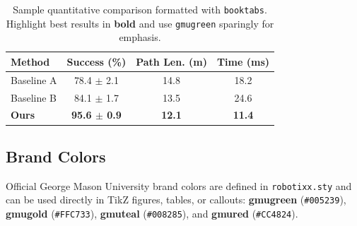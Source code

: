 \begin{table}[t]
    \centering
    \caption{Sample quantitative comparison formatted with \texttt{booktabs}. Highlight best results in \textbf{bold} and use \texttt{gmugreen} sparingly for emphasis.}
    \label{tab:example}
    \small
    \begin{tabular}{lccc}
        \toprule
        \textbf{Method} & \textbf{Success (\%)} & \textbf{Path Len. (m)} & \textbf{Time (ms)} \\
        \midrule
        Baseline A      & 78.4 $\pm$ 2.1        & 14.8                   & 18.2 \\
        Baseline B      & 84.1 $\pm$ 1.7        & 13.5                   & 24.6 \\
        \textbf{Ours}   & \textbf{95.6 $\pm$ 0.9} & \textbf{12.1}        & \textbf{11.4} \\
        \bottomrule
    \end{tabular}
\end{table}

\subsection{Brand Colors}

Official George Mason University brand colors are defined in \texttt{robotixx.sty} and can be used directly in TikZ figures, tables, or callouts: \textcolor{gmugreen}{\textbf{gmugreen}} (\texttt{\#005239}), \textcolor{gmugold}{\textbf{gmugold}} (\texttt{\#FFC733}), \textcolor{gmuteal}{\textbf{gmuteal}} (\texttt{\#008285}), and \textcolor{gmured}{\textbf{gmured}} (\texttt{\#CC4824}).
